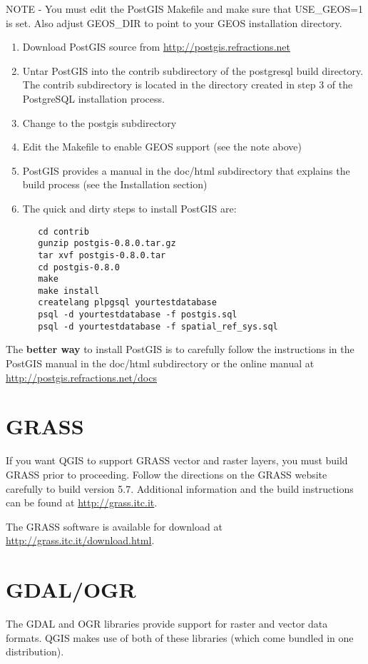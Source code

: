   NOTE - You must edit the PostGIS Makefile and make sure that USE\_GEOS=1 is
  set. Also adjust GEOS\_DIR to point to your GEOS installation directory.
  \begin{enumerate}
  \item Download PostGIS source from \url{http://postgis.refractions.net} 

  \item Untar PostGIS into the contrib subdirectory of the postgresql build directory. The contrib subdirectory is located in the directory created in step 3 of the PostgreSQL installation process.
  \item Change to the postgis subdirectory
  \item Edit the Makefile to enable GEOS support (see the note above)
\item PostGIS provides a manual in the doc/html subdirectory that explains the build process (see the Installation section)
  \item The quick and dirty steps to install PostGIS are:
  \begin{verbatim}
   cd contrib
   gunzip postgis-0.8.0.tar.gz 
   tar xvf postgis-0.8.0.tar 
   cd postgis-0.8.0 
   make 
   make install 
   createlang plpgsql yourtestdatabase 
   psql -d yourtestdatabase -f postgis.sql 
   psql -d yourtestdatabase -f spatial_ref_sys.sql 
  \end{verbatim}
  \end{enumerate}
The \textbf{better way} to install PostGIS is to carefully follow the instructions in the PostGIS manual in the doc/html subdirectory or the online manual at \url{http://postgis.refractions.net/docs}

\section{GRASS}
If you want QGIS to support GRASS vector and raster layers, you must build GRASS prior to proceeding. 
Follow the directions on the GRASS website carefully to build version 5.7. Additional information and the build instructions can be found at \url{http://grass.itc.it}.
 
The GRASS software is available for download at \url{http://grass.itc.it/download.html}.

\section{GDAL/OGR}
  The GDAL and OGR libraries provide support for raster and vector data formats. QGIS makes use of both of these libraries (which come bundled in one distribution).

